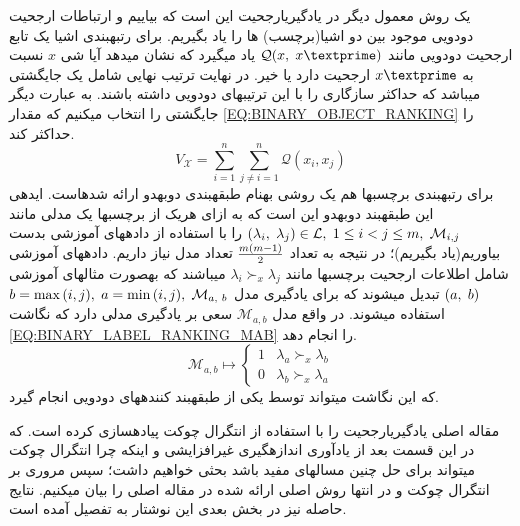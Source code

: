 \documentclass[journal]{IEEEtran}
\newcommand{\نیمفاصله}{\halfspace}
\renewcommand{\ }{\halfspace}
\renewcommand{\یا}{یادگیری\ ارجحیت }
\newcommand{\یم}{یادگیری\ ماشین }
\renewcommand{\تر}{تابع رتبه\ بند }
\newcommand{\ار}{ارجحیت }
\renewcommand{\|}[1][.3em]{\hspace{#1}|\hspace{#1}}
\renewcommand{\,}[1][.3em]{,\hspace{#1}}
\begin{document}
یک روش معمول دیگر در \یا این است که بیاییم و ارتباطات \ار دودویی موجود بین دو اشیا(برچسب) ها را یاد بگیریم. برای رتبه\ بندی اشیا یک تابع \ار دودویی مانند
$\mathcal{Q}(x\, x\textprime)$
یاد می\ گیرد که نشان می\ دهد آیا شی $x$ نسبت به $x\textprime$ \ار دارد یا خیر. در نهایت ترتیب نهایی شامل یک جایگشتی می\ باشد که حداکثر سازگاری را با این ترتیب\ های دودویی داشته باشند. به عبارت دیگر جایگشتی را انتخاب می\ کنیم که مقدار
\ref{EQ:BINARY_OBJECT_RANKING}
را حداکثر کند.
\begin{equation}\label{EQ:BINARY_OBJECT_RANKING}
V_{\mathcal{X}} = \sum_{i = 1} ^ n\sum_{j \neq i = 1} ^ n \mathcal{Q}(x_i, x_j)
\end{equation}
برای رتبه\ بندی برچسب\ ها هم یک روشی به\ نام طبقه\ بندی دوبه\ دو ارائه شده\ است. ایده\ ی این طبقه\ بند دوبه\ دو این است که به ازای هریک از برچسب\ ها یک مدلی مانند
${(\lambda_i\,\lambda_j)\in\mathcal{L}\,1\leq i < j \leq m\,\mathcal{M}_{i,j}}$
را با استفاده از داده\ های آموزشی بدست بیاوریم(یاد بگیریم)؛ در نتیجه به تعداد
${m(m-1)} \over 2$
تعداد مدل نیاز داریم. داده\ های آموزشی شامل اطلاعات ارجحیت برچسب\ ها مانند
$\lambda_i \succ_x \lambda_j$
می\ باشند که به\ صورت مثال\ های آموزشی
$(a\,b)$
تبدیل می\ شوند که برای یادگیری مدل
${b = \max{(i, j)}\, a = \min{(i, j)}\,\mathcal{M}_{a\,b}}$
استفاده می\ شوند. در واقع مدل
$\mathcal{M}_{a, b}$
سعی بر یادگیری مدلی دارد که نگاشت
\ref{EQ:BINARY_LABEL_RANKING_MAB}
را انجام دهد.
\begin{equation}\label{EQ:BINARY_LABEL_RANKING_MAB}
\mathcal{M}_{a, b} \mapsto \begin{cases}
1 & \lambda_a \succ_x \lambda_b\\
0 & \lambda_b \succ_x \lambda_a
\end{cases}
\end{equation}
که این نگاشت می\ تواند توسط یکی از طبقه\ بند کننده\ های دودویی انجام گیرد.


\قسمت{\یا فازی}
مقاله اصلی\
\cite{FPL:MAIN}
\یا را با استفاده از انتگرال چوکت پیاده\ سازی کرده است. که در این قسمت بعد از یادآوری اندازه\ گیری غیرافزایشی و اینکه چرا انتگرال چوکت می\ تواند برای حل چنین مساله\ ای مفید باشد بحثی خواهیم داشت؛ سپس مروری بر انتگرال چوکت و در انتها روش اصلی ارائه شده در مقاله اصلی را بیان می\ کنیم. نتایج حاصله نیز در بخش بعدی این نوشتار به تفصیل آمده است.
\end{document}
